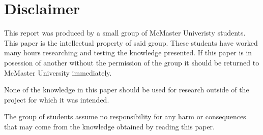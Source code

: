\section*{Disclaimer}

This report was produced by a small group of McMaster Univeristy students.  This paper is the intellectual property of said group.  
These students have worked many hours researching and testing the knowledge presented.  If this paper is in posession of another without the permission of the group it should be returned to McMaster University immediately.

None of the knowledge in this paper should be used for research outside of the project for which it was intended.

The group of students assume no responsibility for any harm or consequences that may come from the knowledge obtained by reading this paper.
